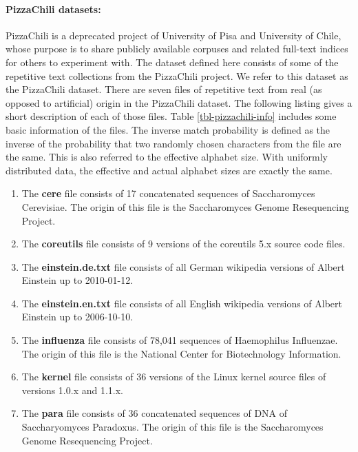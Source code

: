 \documentclass[english,twoside,censored,csm,algorithms-track-2020]{HYthesisML}
\theoremstyle{plain}
\theoremstyle{definition}
\begin{document}
\paragraph{PizzaChili datasets:}
PizzaChili \citep{PizzaChili} is a deprecated project of University of Pisa and University of Chile,
whose purpose is to
share publicly available corpuses and related full-text indices for others to experiment with.
The dataset defined here consists of some of the repetitive text collections from the PizzaChili project.
We refer to this dataset as the PizzaChili dataset.
There are seven files of repetitive text from real (as opposed to artificial) origin in the
PizzaChili dataset. The following listing gives a short description of each of those files. Table \ref{tbl-pizzachili-info}
includes some basic information of the files. The inverse match probability is defined
as the inverse of the probability that two randomly chosen characters from the file are the same. This
is also referred to the effective alphabet size. With uniformly distributed data, the effective and
actual alphabet sizes are exactly the same.

\begin{enumerate}
\item The \textbf{cere} file consists of 17 concatenated sequences of Saccharomyces Cerevisiae. The origin of this file is the Saccharomyces Genome Resequencing Project.
\item The \textbf{coreutils} file consists of 9 versions of the coreutils 5.x source code files.
\item The \textbf{einstein.de.txt} file consists of all German wikipedia versions of Albert Einstein up to 2010-01-12.
\item  The \textbf{einstein.en.txt} file consists of all English wikipedia versions of Albert Einstein up to 2006-10-10.
\item The \textbf{influenza} file consists of 78,041 sequences of Haemophilus Influenzae. The origin of this file is the National Center for Biotechnology Information.
\item The \textbf{kernel} file consists of 36 versions of the Linux kernel source files of versions 1.0.x and 1.1.x.
\item The \textbf{para} file consists of 36 concatenated sequences of DNA of Saccharyomyces Paradoxus. The origin of this file is the Saccharomyces Genome Resequencing Project.
\end{enumerate}
\end{document}
